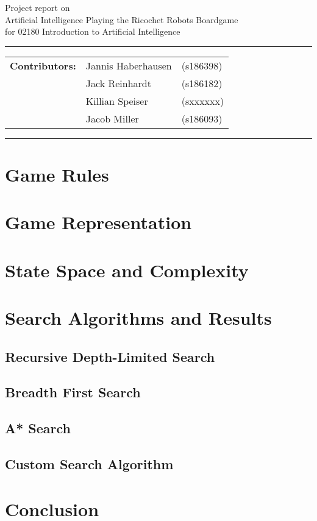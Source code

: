\documentclass[a4paper,10pt]{article}
\begin{document}
\begin{center}
Project report on\\
\vspace{0.5cm}
{{\Large \sc Artificial Intelligence Playing the Ricochet Robots Boardgame}}\\
\vspace{0.5cm} for 02180 Introduction to Artificial Intelligence
\end{center}
\rule{\textwidth}{0.5pt}
\begin{description}
\item\begin{tabular}{rll}
    \textbf{Contributors:}& Jannis Haberhausen &(s186398)\\ & Jack Reinhardt &(s186182)\\ & Killian Speiser &(sxxxxxx)\\ & Jacob Miller &(s186093) \\
\end{tabular}
\end{description}
\rule{\textwidth}{1pt}

\tableofcontents
\section{Game Rules}
\section{Game Representation}
\section{State Space and Complexity}
\section{Search Algorithms and Results}
  \subsection{Recursive Depth-Limited Search}
  \subsection{Breadth First Search}
  \subsection{A* Search}
  \subsection{Custom Search Algorithm}
\section{Conclusion}
\thispagestyle{empty}
\newpage
\end{document}
